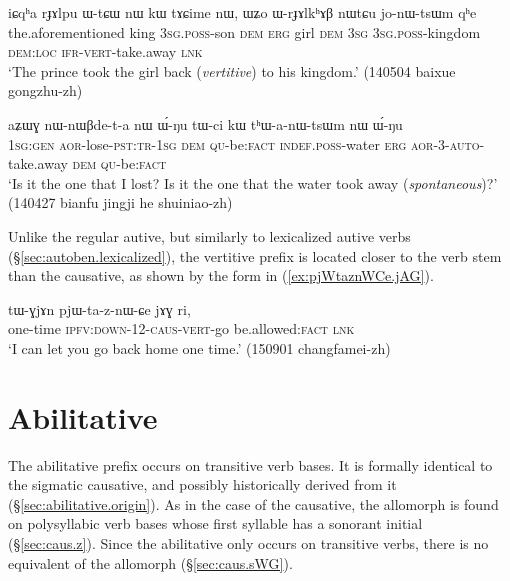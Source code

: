 \begin{exe}
\ex \label{ex:WrJAlkhAB.nWtCu.jonWtsWm}
\gll iɕqʰa rɟɤlpu ɯ-tɕɯ nɯ kɯ tɤɕime nɯ, ɯʑo ɯ-rɟɤlkʰɤβ nɯtɕu jo-nɯ-tsɯm qʰe \\
the.aforementioned king \textsc{3sg}.\textsc{poss}-son \textsc{dem} \textsc{erg} girl \textsc{dem} \textsc{3sg} \textsc{3sg}.\textsc{poss}-kingdom \textsc{dem}:\textsc{loc} \textsc{ifr}-\textsc{vert}-take.away \textsc{lnk} \\
\glt `The prince took the girl back (\textit{vertitive}) to his kingdom.' (140504 baixue gongzhu-zh)
\end{exe}

\begin{exe}
\ex \label{ex:tWci.kW.thanWtsWm}
\gll aʑɯɣ nɯ-nɯβde-t-a nɯ ɯ́-ŋu tɯ-ci kɯ tʰɯ-a-nɯ-tsɯm nɯ ɯ́-ŋu\\
\textsc{1sg}:\textsc{gen} \textsc{aor}-lose-\textsc{pst}:\textsc{tr}-\textsc{1sg} \textsc{dem} \textsc{qu}-be:\textsc{fact} \textsc{indef}.\textsc{poss}-water \textsc{erg} \textsc{aor}-3\flobv{}-\textsc{auto}-take.away \textsc{dem} \textsc{qu}-be:\textsc{fact} \\
\glt `Is it the one that I lost? Is it the one that the water took away (\textit{spontaneous})?' (140427 bianfu jingji he shuiniao-zh)
\end{exe}

Unlike the regular autive, but similarly to lexicalized autive verbs (§\ref{sec:autoben.lexicalized}), the vertitive prefix is located closer to the verb stem than the causative, as shown by the form  in (\ref{ex:pjWtaznWCe.jAG}).

\begin{exe}
\ex \label{ex:pjWtaznWCe.jAG}
\gll  tɯ-ɣjɤn pjɯ-ta-z-nɯ-ɕe jɤɣ ri,  \\
one-time \textsc{ipfv}:\textsc{down}-1\fl{}2-\textsc{caus}-\textsc{vert}-go be.allowed:\textsc{fact} \textsc{lnk} \\
\glt `I can let you go back home one time.' (150901 changfamei-zh) 
\end{exe}

\section{Abilitative} \label{sec:abilitative} 
The abilitative  prefix occurs on transitive verb bases. It is formally identical to the sigmatic causative, and possibly historically derived from it (§\ref{sec:abilitative.origin}).  As in the case of the causative, the allomorph  is found on polysyllabic verb bases whose first syllable has a sonorant initial (§\ref{sec:caus.z}). Since the abilitative only occurs on transitive verbs, there is no equivalent of the  allomorph (§\ref{sec:caus.sWG}).

